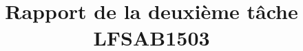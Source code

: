 
\title{\vspace{\fill}\begin{LARGE} \begin{bf}  
Rapport de la deuxième tâche \\
LFSAB1503 \\ 
\end{bf}\end{LARGE}
\vspace{\fill}}


\maketitle
\newpage
\tableofcontents
\newpage
\newpage





\nocite{*}

